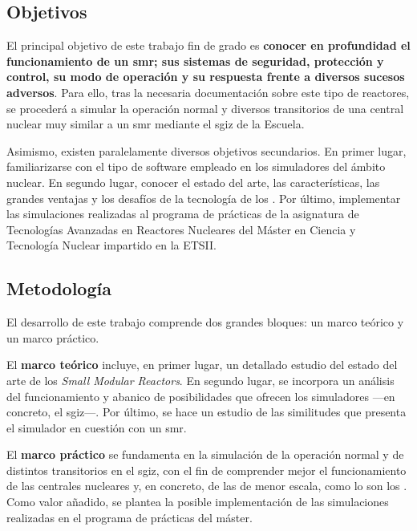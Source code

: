 \subsection{Objetivos}

El principal objetivo de este trabajo fin de grado es \textbf{conocer en profundidad el funcionamiento de un \acrshort{smr}; sus sistemas de seguridad, protección y control, su modo de operación y su respuesta frente a diversos sucesos adversos}. Para ello, tras la necesaria documentación sobre este tipo de reactores, se procederá a simular la operación normal y diversos transitorios de una central nuclear muy similar a un \acrshort{smr} mediante el \acrshort{sgiz} de la Escuela.

Asimismo, existen paralelamente diversos objetivos secundarios. En primer lugar, familiarizarse con el tipo de software empleado en los simuladores del ámbito nuclear. En segundo lugar, conocer el estado del arte, las características, las grandes ventajas y los desafíos de la tecnología de los . Por último, implementar las simulaciones realizadas al programa de prácticas de la asignatura de Tecnologías Avanzadas en Reactores Nucleares del Máster en Ciencia y Tecnología Nuclear impartido en la ETSII.

\subsection{Metodología}

El desarrollo de este trabajo comprende dos grandes bloques: un marco teórico y un marco práctico.

El \textbf{marco teórico} incluye, en primer lugar, un detallado estudio del estado del arte de los \emph{Small Modular Reactors}. En segundo lugar, se incorpora un análisis del funcionamiento y abanico de posibilidades que ofrecen los simuladores ---en concreto, el \acrshort{sgiz}---. Por último, se hace un estudio de las similitudes que presenta el simulador en cuestión con un \acrshort{smr}. 

El \textbf{marco práctico} se fundamenta en la simulación de la operación normal y de distintos transitorios en el \acrshort{sgiz}, con el fin de comprender mejor el funcionamiento de las centrales nucleares y, en concreto, de las de menor escala, como lo son los . Como valor añadido, se plantea la posible implementación de las simulaciones realizadas en el programa de prácticas del máster.